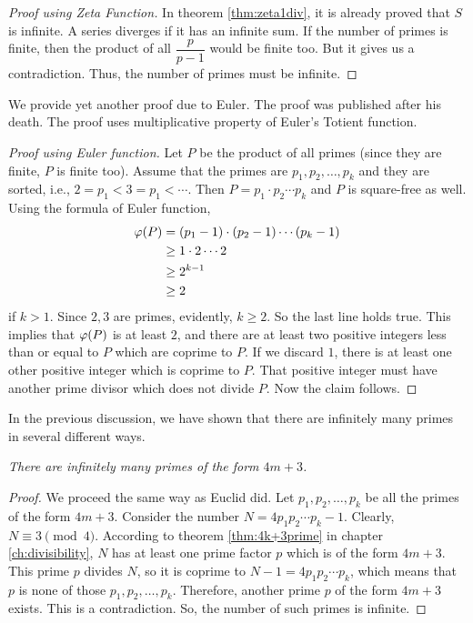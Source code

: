 \documentclass{subfiles}
\begin{document}
		\begin{proof}[Proof using Zeta Function]
			In theorem \eqref{thm:zeta1div}, it is already proved that $S$ is infinite. A series diverges if it has an infinite sum. If the number of primes is finite, then the product of all $\dfrac p{p-1}$ would be finite too. But it gives us a contradiction. Thus, the number of primes must be infinite.
		\end{proof}
	We provide yet another proof due to Euler. The proof was published after his death. The proof uses multiplicative property of Euler's Totient function.
		\begin{proof}[Proof using Euler function]
			Let $P$ be the product of all primes (since they are finite, $P$ is finite too). Assume that the primes are $p_1,p_2,\ldots, p_k$ and they are sorted, i.e., $2=p_1<3=p_1<\cdots$. Then $P = p_1\cdot p_2\cdots p_k$ and $P$ is square-free as well. Using the formula of Euler function,
				\begin{align*}
					\varphi (P)  & = (p_1-1)\cdot(p_2-1)\cdots(p_k-1)\\
							& \geq 1\cdot2\cdots2\\
							& \geq 2^{k-1}\\
							& \geq 2
				\end{align*}
			if $k>1$. Since $2,3$ are primes, evidently, $k\geq2$. So the last line holds true. This implies that $\varphi (P)$ is at least $2$, and there are at least two positive integers less than or equal to $P$ which are coprime to $P$. If we discard $1$, there is at least one other positive integer which is coprime to $P$. That positive integer must have another prime divisor which does not divide $P$. Now the claim follows.
		\end{proof}
	In the previous discussion, we have shown that there are infinitely many primes in several different ways.
		\begin{theorem}\slshape
			There are infinitely many primes of the form $4m+3$.
		\end{theorem}
		
		\begin{proof}
			We proceed the same way as Euclid did. Let $p_1,p_2,\ldots,p_k$ be all the primes of the form $4m+3$. Consider the number $N=4p_1p_2\cdots p_k-1$. Clearly, $N\equiv3\pmod4$. According to theorem \eqref{thm:4k+3prime} in chapter \eqref{ch:divisibility}, $N$ has at least one prime factor $p$ which is of the form $4m+3$. This prime $p$ divides $N$, so it is coprime to $N-1=4p_1p_2\cdots p_k$, which means that $p$ is none of those $p_1,p_2,\ldots,p_k$. Therefore, another prime $p$ of the form $4m+3$ exists. This is a contradiction. So, the number of such primes is infinite.
		\end{proof}
	
\end{document}
